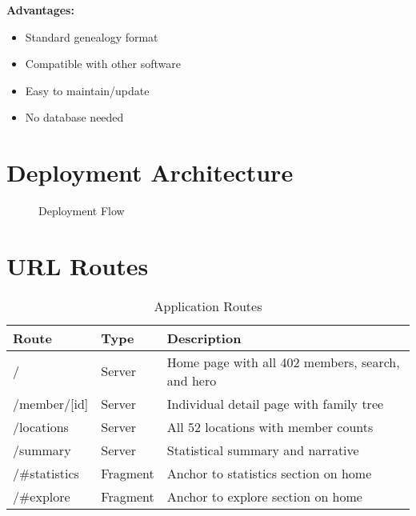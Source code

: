 \documentclass[11pt]{article}
\begin{document}
\textbf{Advantages:}
\begin{itemize}
    \item Standard genealogy format
    \item Compatible with other software
    \item Easy to maintain/update
    \item No database needed
\end{itemize}

\section{Deployment Architecture}

\begin{figure}[h]
\centering
{}
\caption{Deployment Flow}
\end{figure}

\section{URL Routes}

\begin{table}[h]
\centering
\begin{tabular}{|l|l|p{6cm}|}
\hline
\textbf{Route} & \textbf{Type} & \textbf{Description} \\
\hline
/ & Server & Home page with all 402 members, search, and hero \\
\hline
/member/[id] & Server & Individual detail page with family tree \\
\hline
/locations & Server & All 52 locations with member counts \\
\hline
/summary & Server & Statistical summary and narrative \\
\hline
/\#statistics & Fragment & Anchor to statistics section on home \\
\hline
/\#explore & Fragment & Anchor to explore section on home \\
\hline
\end{tabular}
\caption{Application Routes}
\end{table}
\end{document}
